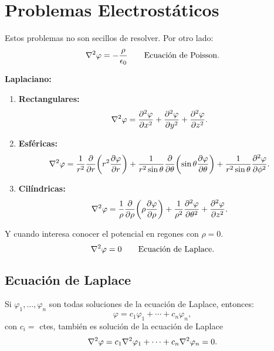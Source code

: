 \chapter{Problemas Electrostáticos}

Estos problemas no son secillos de resolver. Por otro lado:
\begin{equation}
	\laplacian{\varphi} = -\frac{\rho}{\ep} \qquad \text{Ecuación de Poisson}.
\end{equation}

\textbf{Laplaciano:}
\begin{enumerate}
	\item \textbf{Rectangulares:}
	\begin{equation}
		\laplacian{\varphi} = \pdv[2]{\varphi}{x} + \pdv[2]{\varphi}{y} + \pdv[2]{\varphi}{z}.
	\end{equation}
	\item \textbf{Esféricas: }
	\begin{equation}
		\laplacian{\varphi} = \frac{1}{r^2} \pdv{r} \qty(r^2 \pdv{\varphi}{r}) + \frac{1}{r^2 \sin{\theta}} \pdv{\theta} \qty(\sin{\theta} \pdv{\varphi}{\theta}) + \frac{1}{r^2 \sin{\theta}} \pdv[2]{\varphi}{\phi}.
	\end{equation}
	\item \textbf{Cilíndricas: }
	\begin{equation}
		\laplacian{\varphi} = \frac{1}{\rho} \pdv{\rho} \qty(\rho \pdv{\varphi}{\rho}) + \frac{1}{\rho ^2} \pdv[2]{\varphi}{\theta} + \pdv[2]{\varphi}{z}.
	\end{equation}
\end{enumerate}

Y cuando interesa conocer el potencial en regones con $\rho = 0$.
\begin{equation}
	\laplacian{\varphi} = 0 \qquad \text{Ecuación de Laplace.}
\end{equation}

\section{Ecuación de Laplace}
\begin{teorema}
	Si $\varphi _1 ,\ldots ,\varphi _n$ son todas soluciones de la ecuación de Laplace, entonces:
	\begin{equation}
		\varphi = c_1 \varphi _1 + \cdots + c_n \varphi _n,
	\end{equation}
	con $c_i = $ ctes, también es solución de la ecuación de Laplace
	\begin{equation}
		\laplacian{\varphi} = c_1 \laplacian{\varphi}_1 + \cdots + c_n \laplacian{\varphi}_n = 0.
	\end{equation}
\end{teorema}


